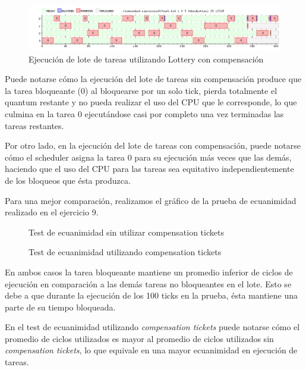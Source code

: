 \documentclass[a4paper,10pt,twoside]{article}
\begin{document}
\begin{figure}[H]
\centering
\includegraphics[width=175mm]{../ejercicio10/GraphSchedLot.png}
\caption{Ejecución de lote de tareas utilizando Lottery con compensación}
\label{GraphSchedLot}
\end{figure}

Puede notarse cómo la ejecución del lote de tareas sin compensación produce que la tarea bloqueante (0) al bloquearse por un solo tick, pierda totalmente el quantum restante y no pueda realizar el uso del CPU que le corresponde, lo que culmina en la tarea 0 ejecutándose casi por completo una vez terminadas las tareas restantes.

Por otro lado, en la ejecución del lote de tareas con compensación, puede notarse cómo el scheduler asigna la tarea 0 para su ejecución más veces que las demás, haciendo que el uso del CPU para las tareas sea equitativo independientemente de los bloqueos que ésta produzca.

Para una mejor comparación, realizamos el gráfico de la prueba de ecuanimidad realizado en el ejercicio 9.

\begin{figure}[H]
	\centering
	
	\caption{Test de ecuanimidad sin utilizar compensation tickets}
\end{figure}

\begin{figure}[H]
	\centering
	
	\caption{Test de ecuanimidad utilizando compensation tickets}
\end{figure}

En ambos casos la tarea bloqueante mantiene un promedio inferior de ciclos de ejecución en comparación a las demás tareas no bloqueantes en el lote. Esto se debe a que durante la ejecución de los 100 ticks en la prueba, ésta mantiene una parte de su tiempo bloqueada.

En el test de ecuanimidad utilizando \textit{compensation tickets} puede notarse cómo el promedio de ciclos utilizados es mayor al promedio de ciclos utilizados sin \textit{compensation tickets}, lo que equivale en una mayor ecuanimidad en ejecución de tareas.
\end{document}
